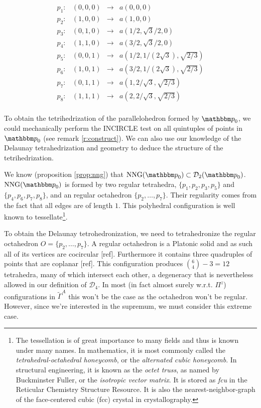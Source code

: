 
$$\begin{matrix}
	p_1: & (0,0,0) & \rightarrow & a(0,0,0) \\
	p_2: & (1,0,0) & \rightarrow & a(1,0,0)\\
	p_3: & (0,1,0) & \rightarrow & a(1/2,\sqrt{3}/2,0)\\
	p_4: & (1,1,0) & \rightarrow & a(3/2,\sqrt{3}/2,0)\\

	p_5: & (0,0,1) & \rightarrow & a(1/2,1/(2\sqrt{3}),\sqrt{2/3})\\
	p_6: & (1,0,1) & \rightarrow & a(3/2,1/(2\sqrt{3}),\sqrt{2/3})\\
	p_7: & (0,1,1) & \rightarrow & a(1,2/\sqrt3, \sqrt{2/3})\\
	p_8: & (1,1,1) & \rightarrow & a(2,2/\sqrt3, \sqrt{2/3})\\
\end{matrix}$$

To obtain the tetrihedrization of the parallelohedron formed by $\p_0$, we could mechanically perform the INCIRCLE test on all quintuples of points in $\p_0$ (see remark \ref{r:construct}). We can also use our knowledge of the Delaunay tetrahedrization and geometry to deduce the structure of the tetrihedrization.

We know (proposition \ref{prop:nng}) that $\text{NNG}(\p_0) \subset \mathcal D_2(\p_0)$. $\text{NNG}(\p_0)$ is formed by two regular tetrahedra, $\{p_1,p_2,p_3,p_5\}$ and $\{p_4,p_6,p_7,p_8\}$, and an regular octahedron $\{p_2,\dots,p_7\}$. Their regularity comes from the fact that all edges are of length $1$. This polyhedral configuration is well known to tessellate\footnote{ The tessellation is of great importance to many fields and thus is known under many names. In mathematics, it is most commonly called the \textit{tetrahedral-octahedral honeycomb}, or the \textit{alternated cubic honeycomb}. In structural engineering, it is known as the \textit{octet truss}, as named by Buckminster Fuller, or the \textit{isotropic vector matrix}. It is stored as \textit{fcu} in the Reticular Chemistry Structure Resource\cite{RCSR}. It is also the nearest-neighbor-graph of the face-centered cubic (fcc) crystal in crystallography\cite{Gabbrielli12}.  }.

To obtain the Delaunay tetrohedronization, we need to tetrahedronize the regular octahedron $O=\{p_2,\dots, p_7\}$. A regular octahedron is a Platonic solid and as such all of its vertices are cocircular [ref]. Furthermore it contains three quadruples of points that are coplanar [ref]. This configuration produces $\binom{6}{4}-3 = 12$ tetrahedra, many of which intersect each other, a degeneracy that is nevertheless allowed in our definition of $\mathcal D_4$. In most (in fact almost surely w.r.t. $\Pi^z$) configurations in $\tilde\Gamma^A$ this won't be the case as the octahedron won't be regular. However, since we're interested in the supremum, we must consider this extreme case.

